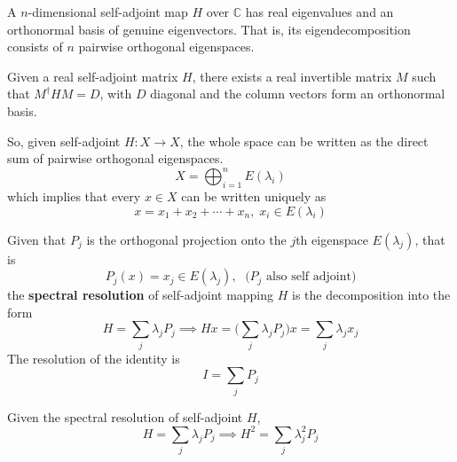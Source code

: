   \begin{theorem}
    A $n$-dimensional self-adjoint map $H$ over $\mathbb{C}$ has real eigenvalues and an orthonormal basis of genuine eigenvectors. That is, its eigendecomposition consists of $n$ pairwise orthogonal eigenspaces. 
  \end{theorem}

  \begin{corollary}
    Given a real self-adjoint matrix $H$, there exists a real invertible matrix $M$ such that $M^\dagger H M = D$, with $D$ diagonal and the column vectors form an orthonormal basis.

    So, given self-adjoint $H: X \longrightarrow X$, the whole space can be written as the direct sum of pairwise orthogonal eigenspaces. 
    \begin{equation}
      X = \bigoplus_{i=1}^n E(\lambda_i)
    \end{equation}
    which implies that every $x \in X$ can be written uniquely as 
    \begin{equation}
      x = x_1 + x_2 + \cdots + x_n, \; x_i \in E(\lambda_i) 
    \end{equation}
  \end{corollary}

  \begin{definition}
    Given that $P_j$ is the orthogonal projection onto the $j$th eigenspace $E(\lambda_j)$, that is
    \begin{equation}
      P_j (x) = x_j \in E(\lambda_j), \; \text{ ($P_j$ also self adjoint)}
    \end{equation}
    the \textbf{spectral resolution} of self-adjoint mapping $H$ is the decomposition into the form 
    \begin{equation}
      H = \sum_j \lambda_j P_j \implies H x = \bigg( \sum_j \lambda_j P_j \bigg) x = \sum_j \lambda_j x_j
    \end{equation}
    The resolution of the identity is
    \begin{equation}
      I = \sum_j P_j
    \end{equation}
  \end{definition}

  \begin{theorem}
    Given the spectral resolution of self-adjoint $H$, 
    \begin{equation}
      H  = \sum_j \lambda_j P_j \implies H^2 = \sum_j \lambda_j^2 P_j
    \end{equation}
  \end{theorem}

